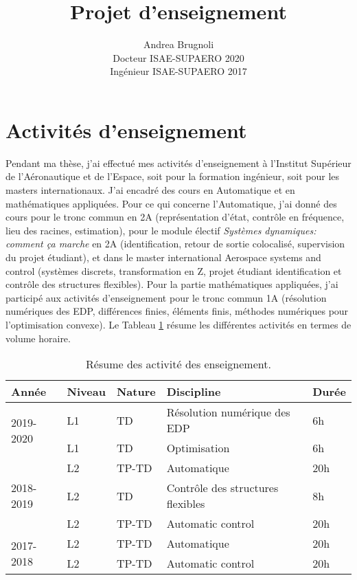 \documentclass[12pt, french]{article}
\author{Andrea Brugnoli \\ 
	\hspace{2.8pt} Docteur ISAE-SUPAERO 2020\\
	Ingénieur ISAE-SUPAERO 2017}
\title{Projet d'enseignement}
\date{}
\begin{document}
	
	\maketitle
	
	
	\thispagestyle{empty}
	
	\tableofcontents


	\section{Activités d'enseignement}
	
	Pendant ma thèse, j'ai effectué mes activités d'enseignement à l'Institut Supérieur de l'Aéronautique et de l'Espace, soit pour la formation ingénieur, soit pour les masters internationaux. J'ai encadré des cours en Automatique et en mathématiques appliquées. Pour ce qui concerne l'Automatique, j'ai donné des cours pour le tronc commun en 2A  (représentation d'état, contrôle en fréquence, lieu des racines, estimation), pour le module électif \textit{Systèmes dynamiques: comment ça marche} en 2A (identification, retour de sortie colocalisé, supervision du projet étudiant), et dans le master international Aerospace systems and control (systèmes discrets, transformation en Z, projet étudiant identification et contrôle des structures flexibles). Pour la partie mathématiques appliquées, j'ai participé aux activités d'enseignement pour le tronc commun 1A (résolution numériques des EDP, différences finies, éléments finis, méthodes numériques pour l'optimisation convexe). Le Tableau \ref{tab:einsegnemnt} résume les différentes activités en termes de volume horaire. 
	
	\begin{table}[h]
		\centering
		\begin{tabular}{p{}p{}p{}p{}p{}}
			\hline
			Année & Niveau & Nature  & Discipline & Durée  \\
			\hline
			\multirow{2}{*}{2019-2020} & L1 & TD &  Résolution numérique des EDP & 6h \\
			& L1 & TD &  Optimisation & 6h \\
			\hline
			\multirow{3}{*}{2018-2019} & L2  & TP-TD  & Automatique & 20h \\
			& L2  & TD     & Contrôle des structures flexibles & 8h \\
			& L2  & TP-TD  & Automatic control & 20h \\
			\hline
			\multirow{2}{*}{2017-2018} & L2  & TP-TD  & Automatique & 20h \\
			& L2  & TP-TD  & Automatic control & 20h \\				   
			\hline
		\end{tabular}
	\caption{Résume des activité des enseignement.}
	\label{tab:einsegnemnt}
	\end{table}
	
\end{document}
